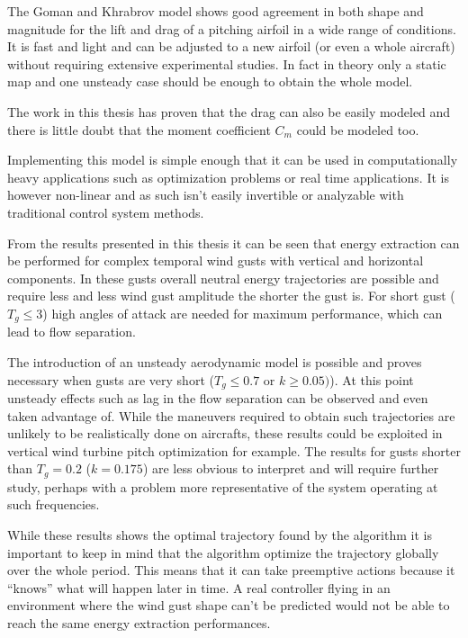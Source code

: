 
\par The Goman and Khrabrov model shows good agreement in both shape and magnitude for the lift and drag of a pitching airfoil in a wide range of conditions.
It is fast and light and can be adjusted to a new airfoil (or even a whole aircraft) without requiring extensive experimental studies.
In fact in theory only a static map and one unsteady case should be enough to obtain the whole model.

\par The work in this thesis has proven that the drag can also be easily modeled and there is little doubt that the moment coefficient $C_m$ could be modeled too.

\par Implementing this model is simple enough that it can be used in computationally heavy applications such as optimization problems or real time applications.
It is however non-linear and as such isn't easily invertible or analyzable with traditional control system methods.


\par From the results presented in this thesis it can be seen that energy extraction can be performed for complex temporal wind gusts with vertical and horizontal components.
In these gusts overall neutral energy trajectories are possible and require less and less wind gust amplitude the shorter the gust is.
For short gust ($T_g \le 3$) high angles of attack are needed for maximum performance, which can lead to flow separation.

\par The introduction of an unsteady aerodynamic model is possible and proves necessary when gusts are very short ($T_g \le 0.7$ or $k \ge 0.05)$).
At this point unsteady effects such as lag in the flow separation can be observed and even taken advantage of.
While the maneuvers required to obtain such trajectories are unlikely to be realistically done on aircrafts, these results could be exploited in vertical wind turbine pitch optimization for example.
The results for gusts shorter than $T_g=0.2$ ($k=0.175$) are less obvious to interpret and will require further study, perhaps with a problem more representative of the system operating at such frequencies.

\par While these results shows the optimal trajectory found by the algorithm it is important to keep in mind that the algorithm optimize the trajectory globally over the whole period.
This means that it can take preemptive actions because it ``knows'' what will happen later in time.
A real controller flying in an environment where the wind gust shape can't be predicted would not be able to reach the same energy extraction performances.


